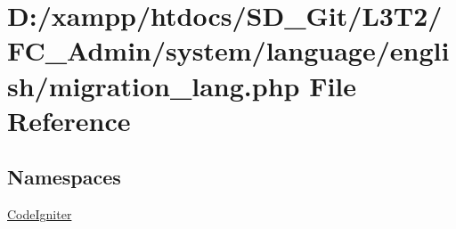 \hypertarget{migration__lang_8php}{}\section{D\+:/xampp/htdocs/\+S\+D\+\_\+\+Git/\+L3\+T2/\+F\+C\+\_\+\+Admin/system/language/english/migration\+\_\+lang.php File Reference}
\label{migration__lang_8php}
\subsection*{Namespaces}
\begin{DoxyCompactItemize}
\item 
 \hyperlink{namespace_code_igniter}{Code\+Igniter}
\end{DoxyCompactItemize}
